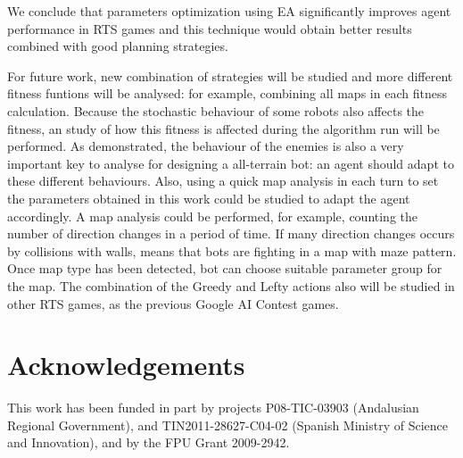 \documentclass[runningheads]{llncs}
\begin{document}
We conclude that parameters optimization using EA significantly improves agent performance in RTS games and this technique would obtain better results combined with good planning strategies.

For future work, new combination of strategies will be studied and more different fitness funtions will be analysed: for example, combining all maps in each fitness calculation. Because the stochastic behaviour of some robots also affects the fitness, an study of how this fitness is affected during the algorithm run will be performed. As demonstrated, the behaviour of the enemies is also a very important key to analyse for designing a all-terrain bot: an agent should adapt to these different behaviours. Also, using a quick map analysis in each turn to set the parameters obtained in this work could be studied to adapt the agent accordingly. A map analysis could be performed, for example, counting the number of
direction changes in a period of time. If many direction changes occurs by collisions with walls, means that bots are fighting in a map with maze pattern. Once map type has been detected, bot can choose suitable parameter group for the map. The combination of the Greedy and Lefty actions also will be studied in other RTS games, as the previous Google AI Contest games.

\section*{Acknowledgements}
This work has been funded in part by projects P08-TIC-03903 (Andalusian Regional Government), and TIN2011-28627-C04-02 (Spanish Ministry of Science and Innovation), and by the FPU Grant 2009-2942.



\end{document}
